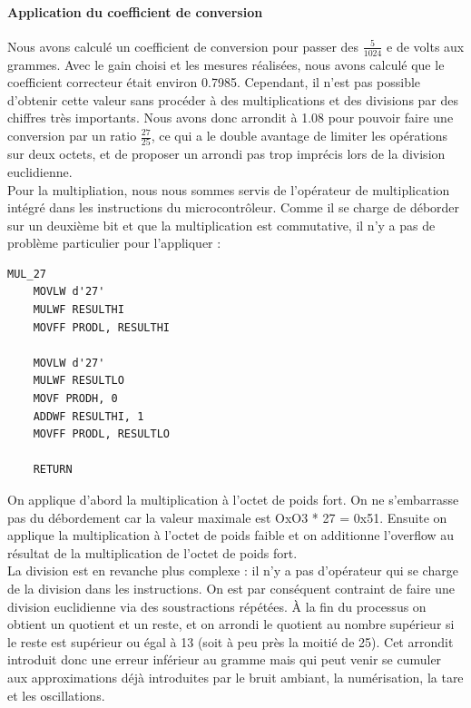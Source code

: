 \documentclass[a4paper,11pt,titlepage]{article}
\begin{document}
\paragraph{Application du coefficient de conversion}

Nous avons calculé un coefficient de conversion pour passer des $\frac{5}{1024}$ e de volts aux grammes. Avec le gain choisi et les mesures réalisées, nous avons calculé que le coefficient correcteur était environ 0.7985. Cependant, il n'est pas possible d'obtenir cette valeur sans procéder à des multiplications et des divisions par des chiffres très importants. Nous avons donc arrondit à 1.08 pour pouvoir faire une conversion par un ratio $\frac{27}{25}$, ce qui a le double avantage de limiter les opérations sur deux octets, et de proposer un arrondi pas trop imprécis lors de la division euclidienne.\\

Pour la multipliation, nous nous sommes servis de l'opérateur de multiplication intégré dans les instructions du microcontrôleur. Comme il se charge de déborder sur un deuxième bit et que la multiplication est commutative, il n'y a pas de problème particulier pour l'appliquer :\\

\begin{lstlisting}
MUL_27
    MOVLW d'27'
    MULWF RESULTHI
    MOVFF PRODL, RESULTHI
    
    MOVLW d'27'
    MULWF RESULTLO
    MOVF PRODH, 0
    ADDWF RESULTHI, 1
    MOVFF PRODL, RESULTLO
    
    RETURN
\end{lstlisting}

On applique d'abord la multiplication à l'octet de poids fort. On ne s'embarrasse pas du débordement car la valeur maximale est OxO3 * 27 = 0x51.
Ensuite on applique la multiplication à l'octet de poids faible et on additionne l'overflow au résultat de la multiplication de l'octet de poids fort.\\

La division est en revanche plus complexe : il n'y a pas d'opérateur qui se charge de la division dans les instructions. On est par conséquent contraint de faire une division euclidienne via des soustractions répétées. À la fin du processus on obtient un quotient et un reste, et on arrondi le quotient au nombre supérieur si le reste est supérieur ou égal à 13 (soit à peu près la moitié de 25). Cet arrondit introduit donc une erreur inférieur au gramme mais qui peut venir se cumuler aux approximations déjà introduites par le bruit ambiant, la numérisation, la tare et les oscillations.\\
\end{document}
